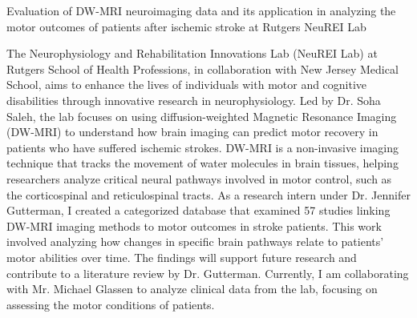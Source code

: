 ﻿Evaluation of DW-MRI neuroimaging data and its application in analyzing the motor outcomes of patients after ischemic stroke at Rutgers NeuREI Lab


The Neurophysiology and Rehabilitation Innovations Lab (NeuREI Lab) at Rutgers School of Health Professions, in collaboration with New Jersey Medical School, aims to enhance the lives of individuals with motor and cognitive disabilities through innovative research in neurophysiology. Led by Dr. Soha Saleh, the lab focuses on using diffusion-weighted Magnetic Resonance Imaging (DW-MRI) to understand how brain imaging can predict motor recovery in patients who have suffered ischemic strokes. DW-MRI is a non-invasive imaging technique that tracks the movement of water molecules in brain tissues, helping researchers analyze critical neural pathways involved in motor control, such as the corticospinal and reticulospinal tracts.
As a research intern under Dr. Jennifer Gutterman, I created a categorized database that examined 57 studies linking DW-MRI imaging methods to motor outcomes in stroke patients. This work involved analyzing how changes in specific brain pathways relate to patients' motor abilities over time. The findings will support future research and contribute to a literature review by Dr. Gutterman. Currently, I am collaborating with Mr. Michael Glassen to analyze clinical data from the lab, focusing on assessing the motor conditions of patients.